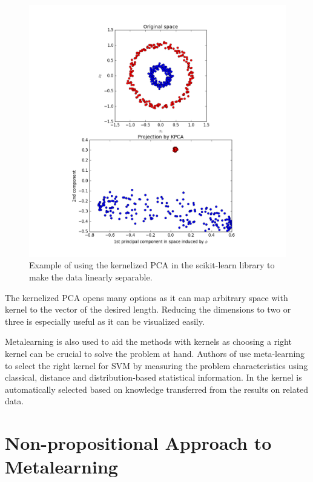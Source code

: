 \begin{figure}
	\includegraphics[width=16cm]{Images/nonlinearitythroughkernels.png}
	\centering
	\caption{Example of using the kernelized PCA in the scikit-learn library \cite{scikit-learn} to make the data linearly separable.}
	\label{fig:nonlinearitythroughkernels}	
\end{figure}
The kernelized PCA opens many options as it can map arbitrary space with kernel to the vector of the desired length. Reducing the dimensions to two or three is especially useful as it can be visualized easily.

Metalearning is also used to aid the methods with kernels as choosing a right kernel can be crucial to solve the problem at hand. Authors of \cite{kernelSelectionMetalearning} use meta-learning to select the right kernel for SVM by measuring the problem characteristics using classical, distance and distribution-based statistical information. In \cite{kernelLearningByTransferLearning} the kernel is automatically selected based on knowledge transferred from the results on related data.

\section{Non-propositional Approach to Metalearning}
\label{section:NonpropositionalApproachToMetalearning}

